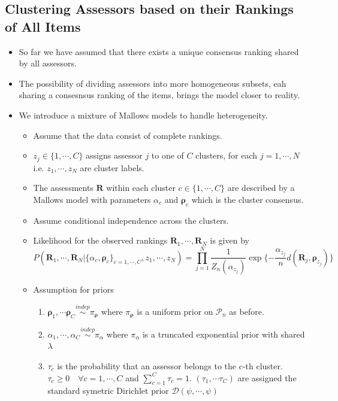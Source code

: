 \documentclass[12pt]{article}
\begin{document}
\subsection{Clustering Assessors based on their Rankings of All Items}
\begin{itemize}
    \item So far we have assumed that there exists a unique consensus ranking shared by all assessors. 
    \item The possibility of dividing assessors into more homogeneous subsets, eah sharing a consesnsus ranking of the items, brings the model closer to reality. 
    \item We introduce a mixture of Mallows models to handle heterogeneity.
    \begin{itemize}
        \item Assume that the data consist of complete rankings.
        \item $z_j\in \{1,\cdots, C\}$ assigns assessor $j$ to one of $C$ clusters, for each $j=1,\cdots, N$ \\ i.e. $z_1, \cdots, z_N$ are cluster labels.
        \item The assessments $\mathbf{R}$ within each cluster $c\in\{1,\cdots, C\}$ are described by a Mallows model with parameters $\alpha_c$ and $\boldsymbol{\rho}_c$ which is the cluster consensus. 
        \item Assume conditional independence across the clusters.
        \item Likelihood for the observed rankings $\mathbf{R}_1, \cdots, \mathbf{R}_N$ is given by \begin{equation*}
            P(\mathbf{R}_1, \cdots, \mathbf{R}_N|\{\alpha_c, \boldsymbol{\rho}_c\}_{c=1,\cdots, C}, z_1, \cdots, z_N)= \prod_{j=1}^N \frac{1}{Z_n(\alpha_{z_j})}\exp\{-\frac{\alpha_{z_j}}{n} d(\mathbf{R}_j, \boldsymbol{\rho}_{z_j})\}
        \end{equation*}
        \item Assumption for priors
        \begin{enumerate}
            \item $\boldsymbol{\rho}_1, \cdots \boldsymbol{\rho}_C \overset{indep}{\sim} \pi_{\boldsymbol{\rho}}$ where $\pi_{\boldsymbol{\rho}}$ is a uniform prior on $\mathcal{P}_n$ as before.
            \item $\alpha_1, \cdots, \alpha_C \overset{indep}{\sim} \pi_\alpha$ where $\pi_\alpha$ is a truncated exponential prior with shared $\lambda$
            \item $\tau_c$ is the probability that an assessor belongs to the c-th cluster. \\ $\tau_c\geq 0 \quad \forall c=1,\cdots, C$ and $\sum_{c=1}^C \tau_c=1$. \; $(\tau_1, \cdots \tau_C)$ are assigned the standard symetric Dirichlet prior $\mathcal{D}(\psi, \cdots, \psi)$

\end{enumerate}
\end{itemize}
\end{itemize}
\end{document}

